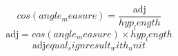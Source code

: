 \[cos({angle_measure})=\frac{{\text{{{adj}}}}}{{{hyp_length}}}\]
\[\text{{{adj}}}=cos({angle_measure})\times {hyp_length}\]
\[\text{{{adj}}}{equal_sign}{result_with_unit}\]
